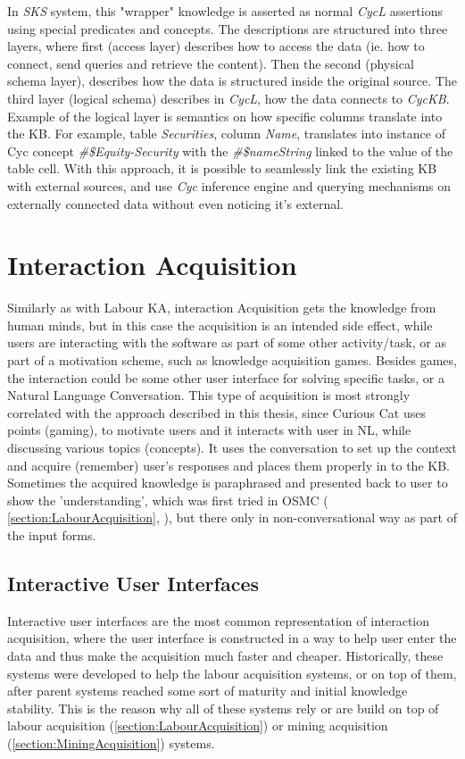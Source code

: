 In \emph{SKS} system, this "wrapper" knowledge is asserted as normal \emph{CycL}
assertions using special predicates and concepts. The descriptions are 
structured into three layers, where first (access layer) describes 
how to access the data (ie. how to connect, send queries and retrieve the 
content). Then the second (physical schema layer), describes how the data is
structured inside the original source. The third layer (logical schema) 
describes in \emph{CycL}, how  the data connects to \emph{CycKB}. Example
of the logical layer is semantics on how specific columns translate into the KB.
For example, table \emph{Securities}, column \emph{Name}, translates into
instance of Cyc concept \emph{\#\$Equity-Security} with the 
\emph{\#\$nameString} linked to the value of the table cell.
With this approach, it is possible to seamlessly link the existing KB with
external sources, and use \emph{Cyc} inference engine and querying mechanisms
on externally connected data without even noticing it's external.


\section{Interaction Acquisition}
Similarly as with Labour KA, interaction Acquisition gets the knowledge from 
human minds, but in this case the acquisition is an intended side effect, while
users are interacting with the software as part of some other activity/task, or
as part of a motivation scheme, such as knowledge acquisition games. Besides 
games, the interaction could be some other user interface for solving specific
tasks, or a Natural Language Conversation. This type of acquisition is most 
strongly correlated with the approach described in this thesis, since Curious 
Cat uses points (gaming), to motivate users and it interacts with user in NL, 
while discussing various topics (concepts). It uses the conversation to set up
the context and acquire (remember) user's responses and places them properly in
to the KB. Sometimes the acquired knowledge is paraphrased and presented back to
user to show the 'understanding', which was first tried in OSMC (
\autoref{section:LabourAcquisition}, \parencite{Singh2002b}), but there only in
non-conversational way as part of the input forms.
 
\subsection{Interactive User Interfaces}
Interactive user interfaces are the most common representation of interaction 
acquisition, where the user interface is constructed in a way to help user enter
the data and thus make the acquisition much faster and cheaper. Historically, 
these systems were developed to help the labour acquisition systems, or on top
of them, after parent systems reached some sort of maturity and initial 
knowledge stability. This is the reason why all of these systems rely or are 
build on top of labour acquisition (\autoref{section:LabourAcquisition}) or 
mining acquisition (\autoref{section:MiningAcquisition}) systems.

